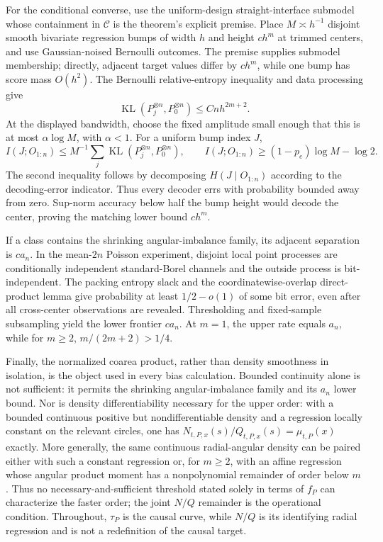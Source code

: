 For the conditional converse, use the uniform-design straight-interface submodel whose containment in \(\mathcal C\) is the theorem's explicit premise.  Place \(M\asymp h^{-1}\) disjoint smooth bivariate regression bumps of width \(h\) and height \(c h^m\) at trimmed centers, and use Gaussian-noised Bernoulli outcomes.  The premise supplies submodel membership; directly, adjacent target values differ by \(c h^m\), while one bump has score mass \(O(h^2)\).  The Bernoulli relative-entropy inequality and data processing give
\[
 \operatorname{KL}(P_j^{\otimes n},P_0^{\otimes n})
 \leq Cn h^{2m+2}.
\]
At the displayed bandwidth, choose the fixed amplitude small enough that this is at most \(\alpha\log M\), with \(\alpha<1\).  For a uniform bump index \(J\),
\[
 I(J;O_{1:n})\leq M^{-1}\sum_j
 \operatorname{KL}(P_j^{\otimes n},P_0^{\otimes n}),
 \qquad
 I(J;O_{1:n})\geq(1-p_e)\log M-\log2.
\]
The second inequality follows by decomposing \(H(J\mid O_{1:n})\) according to the decoding-error indicator.  Thus every decoder errs with probability bounded away from zero.  Sup-norm accuracy below half the bump height would decode the center, proving the matching lower bound \(ch^m\).

If a class contains the shrinking angular-imbalance family, its adjacent separation is \(c a_n\).  In the mean-\(2n\) Poisson experiment, disjoint local point processes are conditionally independent standard-Borel channels and the outside process is bit-independent.  The packing entropy slack and the coordinatewise-overlap direct-product lemma give probability at least \(1/2-o(1)\) of some bit error, even after all cross-center observations are revealed.  Thresholding and fixed-sample subsampling yield the lower frontier \(ca_n\).  At \(m=1\), the upper rate equals \(a_n\), while for \(m\geq2\), \(m/(2m+2)>1/4\).

Finally, the normalized coarea product, rather than density smoothness in isolation, is the object used in every bias calculation.  Bounded continuity alone is not sufficient: it permits the shrinking angular-imbalance family and its \(a_n\) lower bound.  Nor is density differentiability necessary for the upper order: with a bounded continuous positive but nondifferentiable density and a regression locally constant on the relevant circles, one has \(N_{t,P,x}(s)/Q_{t,P,x}(s)=\mu_{t,P}(x)\) exactly.  More generally, the same continuous radial-angular density can be paired either with such a constant regression or, for \(m\geq2\), with an affine regression whose angular product moment has a nonpolynomial remainder of order below \(m\).  Thus no necessary-and-sufficient threshold stated solely in terms of \(f_P\) can characterize the faster order; the joint \(N/Q\) remainder is the operational condition.  Throughout, \(\tau_P\) is the causal curve, while \(N/Q\) is its identifying radial regression and is not a redefinition of the causal target.